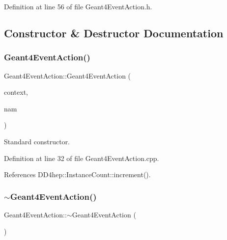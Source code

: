 Definition at line 56 of file Geant4\+Event\+Action.\+h.



\subsection{Constructor \& Destructor Documentation}
\hypertarget{class_d_d4hep_1_1_simulation_1_1_geant4_event_action_ab2184a5387f9034786261c376edb6723}{}\label{class_d_d4hep_1_1_simulation_1_1_geant4_event_action_ab2184a5387f9034786261c376edb6723} 
\subsubsection{\texorpdfstring{Geant4\+Event\+Action()}{Geant4EventAction()}}
{\footnotesize\ttfamily Geant4\+Event\+Action\+::\+Geant4\+Event\+Action (\begin{DoxyParamCaption}\item[{\hyperlink{class_d_d4hep_1_1_simulation_1_1_geant4_context}{Geant4\+Context} $\ast$}]{context,  }\item[{const std\+::string \&}]{nam }\end{DoxyParamCaption})}



Standard constructor. 



Definition at line 32 of file Geant4\+Event\+Action.\+cpp.



References D\+D4hep\+::\+Instance\+Count\+::increment().

\hypertarget{class_d_d4hep_1_1_simulation_1_1_geant4_event_action_aa9e00290e866cfe1f2f471ecdd069291}{}\label{class_d_d4hep_1_1_simulation_1_1_geant4_event_action_aa9e00290e866cfe1f2f471ecdd069291} 
\subsubsection{\texorpdfstring{$\sim$\+Geant4\+Event\+Action()}{~Geant4EventAction()}}
{\footnotesize\ttfamily Geant4\+Event\+Action\+::$\sim$\+Geant4\+Event\+Action (\begin{DoxyParamCaption}{ }\end{DoxyParamCaption})\hspace{0.3cm}{\ttfamily [virtual]}}



